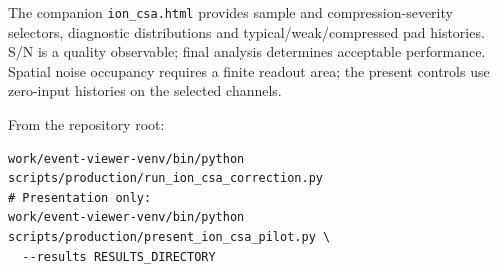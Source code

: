 \documentclass[10pt,a4paper]{article}
\begin{document}
The companion \texttt{ion\_csa.html} provides sample and compression-severity
selectors, diagnostic distributions and typical/weak/compressed pad histories.
S/N is a quality observable; final analysis determines acceptable performance.
Spatial noise occupancy requires a finite readout area; the present controls
use zero-input histories on the selected channels.

From the repository root:
\begin{verbatim}
work/event-viewer-venv/bin/python scripts/production/run_ion_csa_correction.py
# Presentation only:
work/event-viewer-venv/bin/python scripts/production/present_ion_csa_pilot.py \
  --results RESULTS_DIRECTORY
\end{verbatim}
\end{document}
